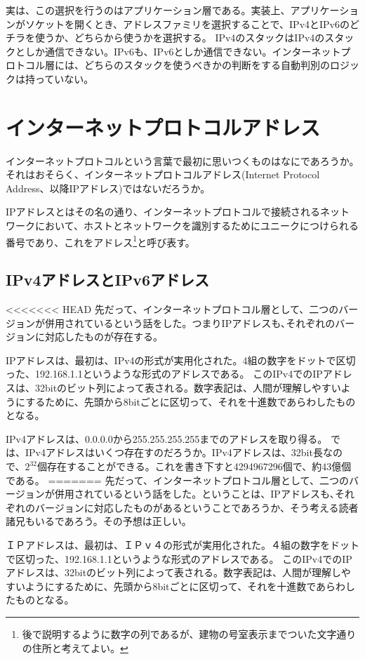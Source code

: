 \begin{itemize}
実は、この選択を行うのはアプリケーション層である。実装上、アプリケーションがソケットを開くとき、アドレスファミリを選択することで、IPv4とIPv6のどチラを使うか、どちらから使うかを選択する。
IPv4のスタックはIPv4のスタックとしか通信できない。IPv6も、IPv6としか通信できない。インターネットプロトコル層には、どちらのスタックを使うべきかの判断をする自動判別のロジックは持っていない。


\section{インターネットプロトコルアドレス}

インターネットプロトコルという言葉で最初に思いつくものはなにであろうか。それはおそらく、インターネットプロトコルアドレス(Internet Protocol Address、以降IPアドレス)ではないだろうか。

IPアドレスとはその名の通り、インターネットプロトコルで接続されるネットワークにおいて、ホストとネットワークを識別するためにユニークにつけられる番号であり、これをアドレス\footnote{後で説明するように数字の列であるが、建物の号室表示までついた文字通りの住所と考えてよい。}と呼び表す。

\subsection{IPv4アドレスとIPv6アドレス}

<<<<<<< HEAD
先だって、インターネットプロトコル層として、二つのバージョンが併用されているという話をした。つまりIPアドレスも､それぞれのバージョンに対応したものが存在する。

IPアドレスは、最初は、IPv4の形式が実用化された。4組の数字をドットで区切った、192.168.1.1というような形式のアドレスである。
このIPv4でのIPアドレスは、32bitのビット列によって表される。数字表記は、人間が理解しやすいようにするために、先頭から8bitごとに区切って、それを十進数であらわしたものとなる。

IPv4アドレスは、0.0.0.0から255.255.255.255までのアドレスを取り得る。
では、IPv4アドレスはいくつ存在すのだろうか。IPv4アドレスは、32bit長なので、$2^{32}$個存在することができる。これを書き下すと4294967296個で、約43億個である。
=======
先だって、インターネットプロトコル層として、二つのバージョンが併用されているという話をした。ということは、IPアドレスも､それぞれのバージョンに対応したものがあるということであろうか、そう考える読者諸兄もいるであろう。その予想は正しい。

ＩＰアドレスは、最初は、ＩＰｖ４の形式が実用化された。４組の数字をドットで区切った、192.168.1.1というような形式のアドレスである。
このIPv4でのIPアドレスは、32bitのビット列によって表される。数字表記は、人間が理解しやすいようにするために、先頭から8bitごとに区切って、それを十進数であらわしたものとなる。


\end{itemize}
